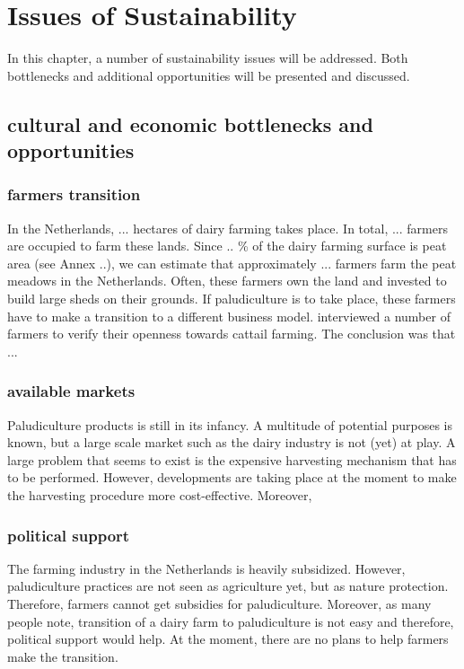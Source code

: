 \documentclass[a4paper,12pt]{scrbook}
\begin{document}
\chapter{Issues of Sustainability}

In this chapter, a number of sustainability issues will be addressed. Both bottlenecks and additional opportunities will be presented and discussed.

\section{cultural and economic bottlenecks and opportunities}

\subsection{farmers transition}
In the Netherlands, ... hectares of dairy farming takes place. In total, ... farmers are occupied to farm these lands. Since .. \% of the dairy farming surface is peat area (see Annex ..), we can estimate that approximately ... farmers farm the peat meadows in the Netherlands. Often, these farmers own the land and invested to build large sheds on their grounds. If paludiculture is to take place, these farmers have to make a transition to a different business model. \citet{} interviewed a number of farmers to verify their openness towards cattail farming. The conclusion was that ... 

\subsection{available markets}
Paludiculture products is still in its infancy. A multitude of potential purposes is known, but a large scale market such as the dairy industry is not (yet) at play. A large problem that seems to exist is the expensive harvesting mechanism that has to  be performed. However, developments are taking place at the moment to make the harvesting procedure more cost-effective. Moreover, 


\subsection{political support}  
The farming industry in the Netherlands is heavily subsidized. However, paludiculture practices are not seen as agriculture yet, but as nature protection. Therefore, farmers cannot get subsidies for paludiculture. Moreover, as many people note, transition of a dairy farm to paludiculture is not easy and therefore, political support would help. At the moment, there are no plans to help farmers make the transition.
\end{document}
